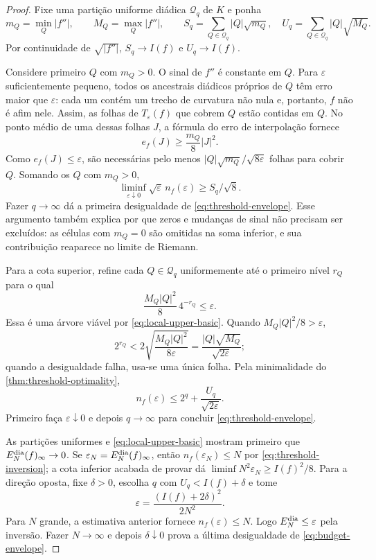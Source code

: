 \documentclass[11pt,a4paper]{article}
\theoremstyle{definition}
\theoremstyle{remark}
\begin{document}
\begin{proof}
Fixe uma partição uniforme diádica $\mathcal Q_q$ de $K$ e ponha
\[
 m_Q=\min_Q|f''|,
 \qquad M_Q=\max_Q|f''|,
 \qquad
 S_q=\sum_{Q\in\mathcal Q_q}|Q|\sqrt{m_Q},
 \quad U_q=\sum_{Q\in\mathcal Q_q}|Q|\sqrt{M_Q}.
\]
Por continuidade de $\sqrt{|f''|}$, $S_q\to I(f)$ e $U_q\to I(f)$.

Considere primeiro $Q$ com $m_Q>0$. O sinal de $f''$ é constante em $Q$.
Para $\varepsilon$ suficientemente pequeno, todos os ancestrais diádicos
próprios de $Q$ têm erro maior que $\varepsilon$: cada um contém um trecho
de curvatura não nula e, portanto, $f$ não é afim nele. Assim, as folhas de
$T_\varepsilon(f)$ que cobrem $Q$ estão contidas em $Q$. No ponto médio de
uma dessas folhas $J$, a fórmula do erro de interpolação fornece
\[
 e_f(J)\ge \frac{m_Q}{8}|J|^2.
\]
Como $e_f(J)\le\varepsilon$, são necessárias pelo menos
$|Q|\sqrt{m_Q}/\sqrt{8\varepsilon}$ folhas para cobrir $Q$. Somando os
$Q$ com $m_Q>0$,
\[
 \liminf_{\varepsilon\downarrow0}
 \sqrt\varepsilon\,n_f(\varepsilon)\ge S_q/\sqrt8.
\]
Fazer $q\to\infty$ dá a primeira desigualdade de
\eqref{eq:threshold-envelope}. Esse argumento também explica por que zeros e
mudanças de sinal não precisam ser excluídos: as células com $m_Q=0$ são
omitidas na soma inferior, e sua contribuição reaparece no limite de Riemann.

Para a cota superior, refine cada $Q\in\mathcal Q_q$ uniformemente até o
primeiro nível $r_Q$ para o qual
\[
 \frac{M_Q|Q|^2}{8}\,4^{-r_Q}\le\varepsilon.
\]
Essa é uma árvore viável por \eqref{eq:local-upper-basic}. Quando
$M_Q|Q|^2/8>\varepsilon$,
\[
 2^{r_Q}<2\sqrt{\frac{M_Q|Q|^2}{8\varepsilon}}
 =\frac{|Q|\sqrt{M_Q}}{\sqrt{2\varepsilon}};
\]
quando a desigualdade falha, usa-se uma única folha. Pela minimalidade do
\cref{thm:threshold-optimality},
\[
 n_f(\varepsilon)
 \le 2^q+\frac{U_q}{\sqrt{2\varepsilon}}.
\]
Primeiro faça $\varepsilon\downarrow0$ e depois $q\to\infty$ para concluir
\eqref{eq:threshold-envelope}.

As partições uniformes e \eqref{eq:local-upper-basic} mostram primeiro que
$E_N^{\rm dia}(f)_\infty\to0$. Se
$\varepsilon_N=E_N^{\rm dia}(f)_\infty$, então
$n_f(\varepsilon_N)\le N$ por \eqref{eq:threshold-inversion}; a cota inferior
acabada de provar dá
$\liminf N^2\varepsilon_N\ge I(f)^2/8$. Para a direção oposta, fixe
$\delta>0$, escolha $q$ com $U_q<I(f)+\delta$ e tome
\[
 \varepsilon=\frac{(I(f)+2\delta)^2}{2N^2}.
\]
Para $N$ grande, a estimativa anterior fornece
$n_f(\varepsilon)\le N$. Logo $E_N^{\rm dia}\le\varepsilon$ pela inversão.
Fazer $N\to\infty$ e depois $\delta\downarrow0$ prova a última desigualdade
de \eqref{eq:budget-envelope}.
\end{proof}
\end{document}
